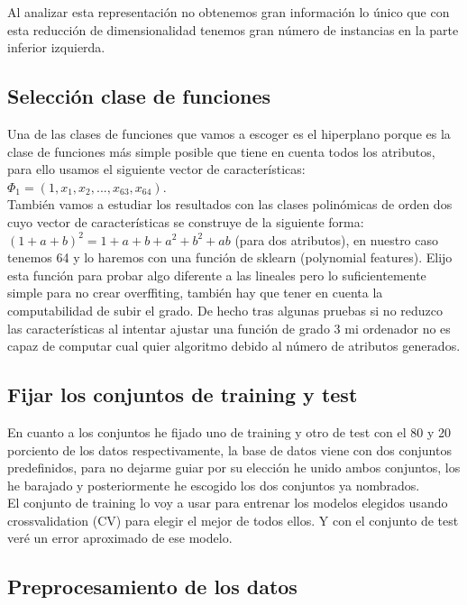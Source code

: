\documentclass[a4paper,11pt]{article}
\begin{document}
Al analizar esta representación no obtenemos gran información lo único que con esta reducción de dimensionalidad tenemos gran número de instancias en la parte inferior izquierda. 

\subsection{Selección clase de funciones}

Una de las clases de funciones que vamos a escoger es el hiperplano porque es la clase de funciones más simple posible que tiene en cuenta todos los atributos, para ello usamos el siguiente vector de características: $\Phi_1=(1,x_1,x_2,...,x_{63},x_{64})$.\\

También vamos a estudiar los resultados con las clases polinómicas de orden dos cuyo vector de características se construye de la siguiente forma: $(1+a+b)^2=1+a+b+a^2+b^2+ab$ (para dos atributos), en nuestro caso tenemos 64 y lo haremos con una función de sklearn (polynomial features). Elijo esta función para probar algo diferente a las lineales pero lo suficientemente simple para no crear overffiting, también hay que tener en cuenta la computabilidad de subir el grado. De hecho tras algunas pruebas si no reduzco las características al intentar ajustar una función de grado 3 mi ordenador no es capaz de computar cual quier algoritmo debido al número de atributos generados.

\subsection{Fijar los conjuntos de training y test}

En cuanto a los conjuntos he fijado uno de training y otro de test con el 80 y 20 porciento de los datos respectivamente, la base de datos viene con dos conjuntos predefinidos, para no dejarme guiar por su elección he unido ambos conjuntos, los he barajado y posteriormente he escogido los dos conjuntos ya nombrados.\\

El conjunto de training lo voy a usar para entrenar los modelos elegidos usando crossvalidation (CV) para elegir el mejor de todos ellos. Y con el conjunto de test veré un error aproximado de ese modelo.

\subsection{Preprocesamiento de los datos}
\end{document}
